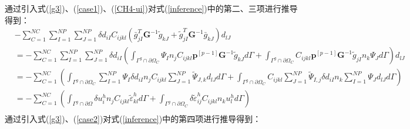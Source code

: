 通过引入式(\ref{g3})、(\ref{case1})、(\ref{CH4-ui})对式(\ref{inference})中的第二、三项进行推导得到：
\begin{equation}\label{CH4-tildeK}
\begin{split}
    &-\sum_{C=1}^{N\!C}\sum_{I=1}^{N\!P}\sum_{J=1}^{N\!P}\delta d_{iI}C_{ijkl}(\bar{g}_{jI}^T\pmb{G}^{-1}\tilde{g}_{kJ}+\tilde{g}_{jI}^T\pmb{G}^{-1}\bar{g}_{kJ})d_{lJ}\\
    &=-\sum_{C=1}^{N\!C}\sum_{I=1}^{N\!P}\sum_{J=1}^{N\!P}\delta d_{iI}(\int_{\Gamma^g\cap\partial\Omega_C}\Psi_In_jC_{ijkl}\pmb{p}^{[p-1]}\pmb{G}^{-1}\tilde{g}_{kJ}d\Gamma+\int_{\Gamma^g\cap\partial\Omega_C}C_{ijkl}\pmb{p}^{[p-1]}\pmb{G}^{-1}\tilde{g}_{jI}n_k\Psi_Jd\Gamma)d_{lJ}\\
    &=-\sum_{C=1}^{N\!C}(\int_{\Gamma^g\cap\partial\Omega_C}\sum_{I=1}^{N\!P}\Psi_I\delta d_{iI}n_jC_{ijkl}\sum_{J=1}^{N\!P}\tilde{\Psi}_{J,k}d_{lJ}d\Gamma+\int_{\Gamma^g\cap\partial\Omega_C}C_{ijkl}\sum_{J=1}^{N\!P}\tilde{\Psi}_{I,j}\delta d_{iI}n_k\sum_{I=1}^{N\!P}\Psi_Jd_{lJ}d\Gamma)\\
    &=-\sum_{C=1}^{N\!C}(\int_{\Gamma^g\cap\partial\Omega}\delta u_i^hn_jC_{ijkl}\tilde{\varepsilon}_{kl}^hd\Gamma+\int_{\Gamma^g\cap\partial\Omega_C}\delta\tilde{\varepsilon}_{ij}^hC_{ijkl}n_ku^h_ld\Gamma)\\
\end{split}
\end{equation}
通过引入式(\ref{g3})、(\ref{case2})对式(\ref{inference})中的第四项进行推导得到：
